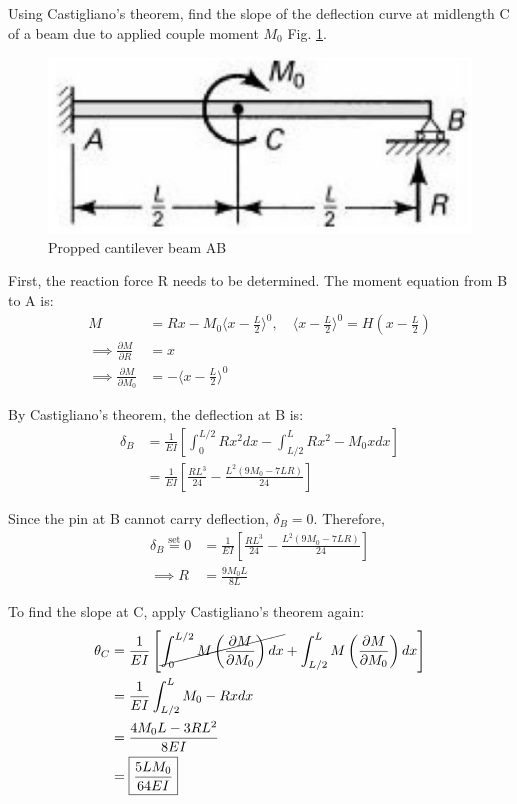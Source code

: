 \section{}
Using Castigliano's theorem, find the slope of the deflection curve at midlength C of a beam due to 
applied couple moment $M_0$ Fig. \ref{fig:Q4ProblemDiagram}.

\begin{figure}[h]
    \centering
    \includegraphics[width=0.5\linewidth]{Questions/Figures/Q4ProblemDiagram.png}
    \caption{Propped cantilever beam AB}
    \label{fig:Q4ProblemDiagram}
\end{figure}

First, the reaction force R needs to be determined. The moment equation from B to A is:
\begin{align*}
    M &= Rx - M_0 \langle x-  \frac{L}{2} \rangle^0, \quad \langle x-  \frac{L}{2} \rangle^0 = H\left(x - \frac{L}{2}\right) \\
    \implies \frac{\partial M}{\partial R} &= x \\
    \implies \frac{\partial M}{\partial M_0} &= -\langle x-  \frac{L}{2} \rangle^0 
\end{align*}

By Castigliano's theorem, the deflection at B is:
\begin{align*}
    \delta_B &= \frac{1}{EI} \left[\int_{0}^{L/2} Rx^2 dx - \int_{L/2}^{L} Rx^2 - M_0x dx \right] \\
    &= \frac{1}{EI} \left[\frac{RL^3}{24} - \frac{L^2(9M_0 - 7LR)}{24} \right] 
\end{align*}

Since the pin at B cannot carry deflection, $\delta_B = 0$. Therefore,
\begin{align*}
    \delta_B \overset{\text{set}}{=} 0 &= \frac{1}{EI} \left[\frac{RL^3}{24} - \frac{L^2(9M_0 - 7LR)}{24} \right] \\
    \implies R &= \boxed{\frac{9M_0L}{8 L}}
\end{align*}    

To find the slope at C, apply Castigliano's theorem again:
\begin{align*}
    \theta_C &= \frac{1}{EI} \left[\cancel{\int_{0}^{L/2} M \left(\frac{\partial M}{\partial M_0}\right) dx}
     + \int_{L/2}^{L} M \left(\frac{\partial M}{\partial M_0}\right) dx \right] \\
    &= \frac{1}{EI} \int_{L/2}^{L}  M_0 - Rx dx \\
    &= \frac{4 M_0L - 3RL^2}{8EI} \\
    &= \boxed{\frac{5LM_0}{64EI}}
\end{align*}